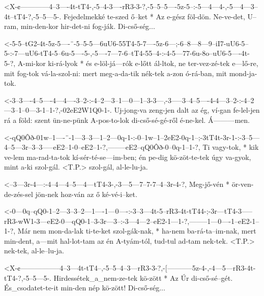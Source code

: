   {<X-¢------------4--3----4t-tT4-,-5--4-3----rR3-3-?,-5--5--5----5z-5--:-5---4---4-,-5---4---3--4t--tT4-?,-5--5---5-.}
  {   Fejedelmekké te-szed ő--ket * Az e-gész föl-dön. Ne-ve-det, U--ram, min-den-kor hir-det-ni fog-ják.   Di-cső-ség...}

  {<-5-5--tG2-4t-5z-5----¨-5--5-5---6uU6-55T4-5-7----5z-6---;-6--8---8---9--iI7-uU6-5--5-:-7---uU6-tT4-5--6u-5----5-,-5----7---7-6--tT4-55--4-:-4-5---77-6u-8o--uU6-5----4t-5-?,}
  {  A-mi-kor ki-rá-lyok * és e-löl-já---rók  e-lőtt ál-ltok, ne ter-vez-zé-tek e---lő-re, mit fog-tok vá-la-szol-ni: mert meg-a-da-tik nék-tek a-zon ó-rá-ban, mit mond-ja-tok.}


  {<-3--3----4--5----4---4----3--2-:-4--2---3--1---0---1--3-3---,-3-----3--4--5----4-4---3--2-:-4--2---3--1--0---3-1--1-?,-02eE2W1Q0-1-.}
  {  Uj-jong-va zeng-jen dalt az ég, ví-gan fe-lel-jen rá a föld: szent ün-ne-pünk A-pos-to-lok di-cső-sé-gé-ről é-ne-kel. Á---------men.}

  {<-qQ0Ôð-01w--1----¨-1---3--3---1--2---0q-1-:-0--1w--1--2eE2-0q-1--;-3tT4t-3r-1-:-3--5---4--5---3r--3--3-----eE2--1-0--eE2--1-?,--------eE2--qQ0Ôð-0--0q-1--1-?,}
  {  Ti    vagy-tok, * kik ve-lem ma-rad-ta-tok kí-sér-té-se---im-ben; én    pe-dig kö-zöt-te-tek úgy va-gyok, mint a-ki szol-gál. <T.P.> szol-gál,  al-le-lu-ja.}

  {<--3---3r-4---:-4--4---4--5---4---tT4-3-,-3---5---7--7-7--4--3r-4-?,}
  {   Meg-jő-vén * ör-ven-de-zés-sel jön-nek hoz-ván az ő ké-vé-i--ket.}

  {<-0---0q--qQ0-1--2---3--3--2---1----1---0----:-3--3---4t-5--rR3-4t-tT44-;-3r---tT4-3-----rR3-wW1-3---eE2-0---qQ0-1--3-3r---3--:-3---4---2--eE2-1---1-?,--------1---0----1--eE2-1--1-?,}
  {  Már nem mon-da-lak ti-te-ket szol-gák-nak, * ha-nem ba-rá-ta--im-nak,   mert min-dent, a---mit hal-lot-tam az  én A-tyám-tól, tud-tul ad-tam nek-tek. <T.P.> nek-tek, al-le--lu-ja.}

  {<X-¢-----------------4--3---4t-tT4--,-5--5--4--3---rR3-3-?,-[-----------5z-4-,-4---5---rR3-4t-tT4-?,-5--5---5-.}
  {   Hirdessétek_a_nem-ze-tek kö-zött * Az Úr di-cső-sé--gét. És_csodatet-te-it  min-den nép kö-zött!  Di-cső-ség...}

